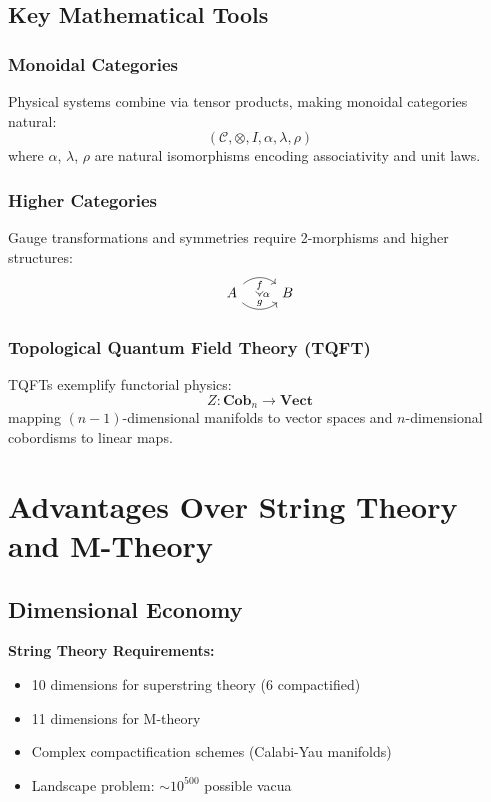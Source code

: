 \documentclass[11pt,a4paper]{article}
\newcommand{\Cob}{\mathbf{Cob}}
\newcommand{\Vect}{\mathbf{Vect}}
\begin{document}
\subsection{Key Mathematical Tools}

\subsubsection{Monoidal Categories}
Physical systems combine via tensor products, making monoidal categories natural:
\[
(\mathcal{C}, \otimes, I, \alpha, \lambda, \rho)
\]
where $\alpha$, $\lambda$, $\rho$ are natural isomorphisms encoding associativity and unit laws.

\subsubsection{Higher Categories}
Gauge transformations and symmetries require 2-morphisms and higher structures:
\[
\begin{tikzcd}
A \arrow[r, bend left=40, "f"'{name=F}] \arrow[r, bend right=40, "g"{name=G}] & B
\arrow[Rightarrow, from=F, to=G, "\alpha"]
\end{tikzcd}
\]

\subsubsection{Topological Quantum Field Theory (TQFT)}
TQFTs exemplify functorial physics:
\[
Z: \Cob_n \to \Vect
\]
mapping $(n-1)$-dimensional manifolds to vector spaces and $n$-dimensional cobordisms to linear maps.

\section{Advantages Over String Theory and M-Theory}

\subsection{Dimensional Economy}

\textbf{String Theory Requirements:}
\begin{itemize}
    \item 10 dimensions for superstring theory (6 compactified)
    \item 11 dimensions for M-theory
    \item Complex compactification schemes (Calabi-Yau manifolds)
    \item Landscape problem: $\sim 10^{500}$ possible vacua
\end{itemize}
\end{document}
